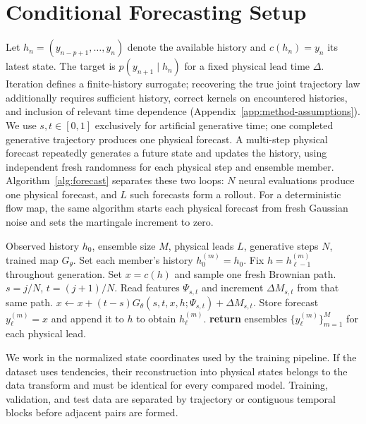 \section{Conditional Forecasting Setup}
Let $h_n=(y_{n-p+1},\ldots,y_n)$ denote the available history and $c(h_n)=y_n$ its latest state. The target is $p(y_{n+1}\mid h_n)$ for a fixed physical lead time $\Delta$. Iteration defines a finite-history surrogate; recovering the true joint trajectory law additionally requires sufficient history, correct kernels on encountered histories, and inclusion of relevant time dependence (Appendix~\ref{app:method-assumptions}). We use $s,t\in[0,1]$ exclusively for artificial generative time; one completed generative trajectory produces one physical forecast. A multi-step physical forecast repeatedly generates a future state and updates the history, using independent fresh randomness for each physical step and ensemble member. Algorithm~\ref{alg:forecast} separates these two loops: $N$ neural evaluations produce one physical forecast, and $L$ such forecasts form a rollout. For a deterministic flow map, the same algorithm starts each physical forecast from fresh Gaussian noise and sets the martingale increment to zero.

\begin{algorithm}[t]
\caption{Map Steps Within an Autoregressive Forecast}
\label{alg:forecast}
\begin{algorithmic}[1]
\REQUIRE Observed history $h_0$, ensemble size $M$, physical leads $L$, generative steps $N$, trained map $G_\theta$.
\STATE Set each member's history $h_0^{(m)}=h_0$.
    \STATE Fix $h=h_{\ell-1}^{(m)}$ throughout generation.
    \STATE Set $x=c(h)$ and sample one fresh Brownian path.
      \STATE $s=j/N$, $t=(j+1)/N$.
      \STATE Read features $\Psi_{s,t}$ and increment $\Delta M_{s,t}$ from that same path.
      \STATE $x\gets x+(t-s)G_\theta(s,t,x,h;\Psi_{s,t})+\Delta M_{s,t}$.
    \ENDFOR
    \STATE Store forecast $y_\ell^{(m)}=x$ and append it to $h$ to obtain $h_\ell^{(m)}$.
  \ENDFOR
\ENDFOR
\STATE \textbf{return} ensembles $\{y_\ell^{(m)}\}_{m=1}^M$ for each physical lead.
\end{algorithmic}
\end{algorithm}

We work in the normalized state coordinates used by the training pipeline. If the dataset uses tendencies, their reconstruction into physical states belongs to the data transform and must be identical for every compared model. Training, validation, and test data are separated by trajectory or contiguous temporal blocks before adjacent pairs are formed.

